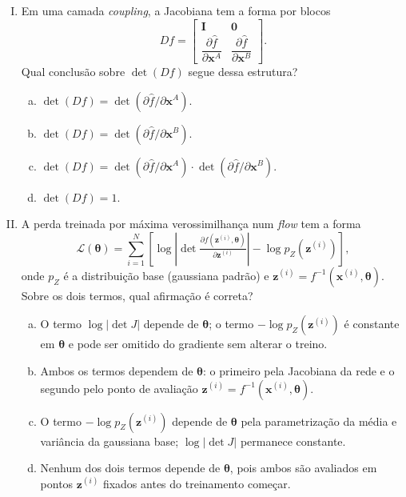 \documentclass{dlproblemset}
\newcommand{\thetav}{\boldsymbol{\theta}}
\begin{document}
\begin{enumerate}[I)]
    \item Em uma camada \textit{coupling}, a Jacobiana tem a forma por blocos
    \[
        Df =
        \begin{bmatrix}
            \mathbf{I} & \mathbf{0} \\
            \dfrac{\partial \hat{f}}{\partial \mathbf{x}^{A}} & \dfrac{\partial \hat{f}}{\partial \mathbf{x}^{B}}
        \end{bmatrix}.
    \]
    Qual conclusão sobre $\det(Df)$ segue dessa estrutura?
    \begin{enumerate}[(a)]
        \item $\det(Df) = \det(\partial \hat{f}/\partial \mathbf{x}^{A})$.
        \item $\det(Df) = \det(\partial \hat{f}/\partial \mathbf{x}^{B})$.
        \item $\det(Df) = \det(\partial \hat{f}/\partial \mathbf{x}^{A}) \cdot \det(\partial \hat{f}/\partial \mathbf{x}^{B})$.
        \item $\det(Df) = 1$.
    \end{enumerate}

    \item A perda treinada por máxima verossimilhança num \textit{flow} tem a forma
    \[
        \mathcal{L}(\thetav) = \sum_{i=1}^{N}\left[\log\left|\det \tfrac{\partial f(\mathbf{z}^{(i)},\thetav)}{\partial \mathbf{z}^{(i)}}\right| - \log p_Z(\mathbf{z}^{(i)})\right],
    \]
    onde $p_Z$ é a distribuição base (gaussiana padrão) e $\mathbf{z}^{(i)} = f^{-1}(\mathbf{x}^{(i)}, \thetav)$. Sobre os dois termos, qual afirmação é correta?
    \begin{enumerate}[(a)]
        \item O termo $\log|\det J|$ depende de $\thetav$; o termo $-\log p_Z(\mathbf{z}^{(i)})$ é constante em $\thetav$ e pode ser omitido do gradiente sem alterar o treino.
        \item Ambos os termos dependem de $\thetav$: o primeiro pela Jacobiana da rede e o segundo pelo ponto de avaliação $\mathbf{z}^{(i)} = f^{-1}(\mathbf{x}^{(i)}, \thetav)$.
        \item O termo $-\log p_Z(\mathbf{z}^{(i)})$ depende de $\thetav$ pela parametrização da média e variância da gaussiana base; $\log|\det J|$ permanece constante.
        \item Nenhum dos dois termos depende de $\thetav$, pois ambos são avaliados em pontos $\mathbf{z}^{(i)}$ fixados antes do treinamento começar.
    \end{enumerate}


\end{enumerate}
\end{document}
